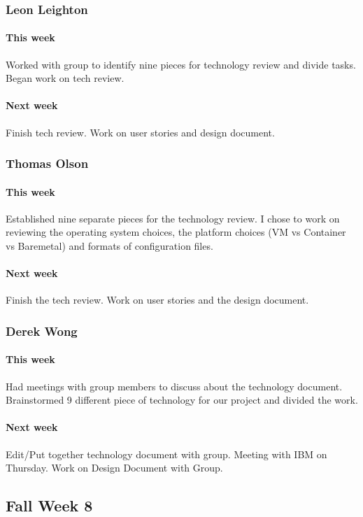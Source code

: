 \documentclass[10pt,letterpaper,onecolumn,draftclsnofoot]{IEEEtran}
\begin{document}
\subsubsection{Leon Leighton}
\paragraph{This week}Worked with group to identify nine pieces for technology review and divide tasks. Began work on tech review.
\paragraph{Next week}Finish tech review. Work on user stories and design document.

\subsubsection{Thomas Olson}
\paragraph{This week}Established nine separate pieces for the technology review. 
I chose to work on reviewing the operating system choices, the platform choices (VM vs Container vs Baremetal) 
and formats of configuration files.
\paragraph{Next week}Finish the tech review. Work on user stories and the design document.

\subsubsection{Derek Wong}
\paragraph{This week}Had meetings with group members to discuss about the technology document.    
Brainstormed 9 different piece of technology for our project and divided the work.
\paragraph{Next week}Edit/Put together technology document with group.                         
Meeting with IBM on Thursday.        
Work on Design Document with Group.

\subsection{Fall Week 8}
\end{document}
